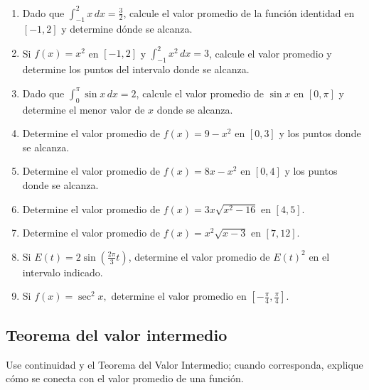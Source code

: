 \documentclass[12pt]{article}
\begin{document}
\begin{enumerate}[resume]
\item Dado que $\int_{-1}^{2}x\,dx=\frac32$, calcule el valor promedio de la función identidad en $[-1,2]$ y determine dónde se alcanza.

\item Si $f(x)=x^2$ en $[-1,2]$ y $\int_{-1}^{2}x^2\,dx=3$,
calcule el valor promedio y determine los puntos del intervalo donde se alcanza.

\item Dado que $\int_0^\pi\sin x\,dx=2$, calcule el valor promedio de $\sin x$ en $[0,\pi]$ y determine el menor valor de $x$ donde se alcanza.
\item Determine el valor promedio de $f(x)=9-x^2$ en $[0,3]$ y los puntos donde se alcanza.

\item Determine el valor promedio de $f(x)=8x-x^2$ en $[0,4]$ y los puntos donde se alcanza.

\item Determine el valor promedio de $f(x)=3x\sqrt{x^2-16}$ en $[4,5]$.

\item Determine el valor promedio de $f(x)=x^2\sqrt{x-3}$ en $[7,12]$.

\item Si $E(t)=2\sin\left(\frac{2\pi}{3}t\right)$, determine el valor promedio
de $E(t)^2$ en el intervalo indicado.

\item Si $f(x)=\sec^2x,$ determine el valor promedio en $\left[-\frac{\pi}{4},\frac{\pi}{4}\right].$

\end{enumerate}
\subsection{Teorema del valor intermedio}
Use continuidad y el Teorema del Valor Intermedio; cuando corresponda, explique cómo se conecta con el valor promedio de una función.
\end{document}
